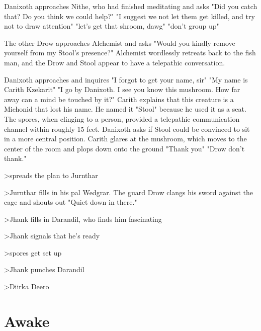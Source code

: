 \documentclass[letterpaper,10pt,twoside,twocolumn,openany]{book}
\begin{document}
Danixoth approaches Nithe, who had finished meditating and asks "Did you catch that? Do you think we could help?" "I suggest we not let them get killed, and try not to draw attention" "let's get that shroom, dawg" "don't group up"

The other Drow approaches Alchemist and asks "Would you kindly remove yourself from my Stool's presence?" Alchemist wordlessly retreats back to the fish man, and the Drow and Stool appear to have a telepathic conversation.

Danixoth approaches and inquires "I forgot to get your name, sir" "My name is Carith Kzekarit" "I go by Danixoth. I see you know this mushroom. How far away can a mind be touched by it?" Carith explains that this creature is a Michonid that lost his name. He named it "Stool" because he used it as a seat. The spores, when clinging to a person, provided a telepathic communication channel within roughly 15 feet. Danixoth asks if Stool could be convinced to sit in a more central position. Carith glares at the mushroom, which moves to the center of the room and plops down onto the ground "Thank you" "Drow don't thank."

>spreads the plan to Jurnthar

>Jurnthar fills in his pal Wedgrar. The guard Drow clangs his sword against the cage and shouts out "Quiet down in there."

>Jhank fills in Darandil, who finds him fascinating

>Jhank signals that he's ready 

>spores get set up

>Jhank punches Darandil

>Diirka Deero

\section{Awake}
\end{document}
